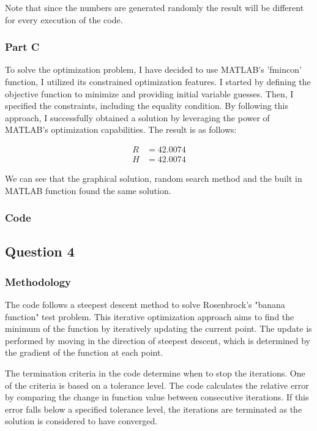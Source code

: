 \documentclass[12pt, a4paper]{article}
\numberwithin{equation}{section}
\begin{document}
Note that since the numbers are generated randomly the result will be different for every execution of the code.

\subsubsection{Part C}

To solve the optimization problem, I have decided to use MATLAB's 'fmincon' function, I utilized its constrained optimization features. I started by defining the objective function to minimize and providing initial variable guesses. Then, I specified the constraints, including the equality condition. By following this approach, I successfully obtained a solution by leveraging the power of MATLAB's optimization capabilities. The result is as follows:

\begin{align}
R &= 42.0074 \\
H &= 42.0074
\end{align}

We can see that the graphical solution, random search method and the built in MATLAB function found the same solution.

\newpage
\subsubsection{Code}


\newpage

\subsection{Question 4}
\subsubsection{Methodology}
The code follows a steepest descent method to solve Rosenbrock's "banana function" test problem. This iterative optimization approach aims to find the minimum of the function by iteratively updating the current point. The update is performed by moving in the direction of steepest descent, which is determined by the gradient of the function at each point.

The termination criteria in the code determine when to stop the iterations. One of the criteria is based on a tolerance level. The code calculates the relative error by comparing the change in function value between consecutive iterations. If this error falls below a specified tolerance level, the iterations are terminated as the solution is considered to have converged.
\end{document}
